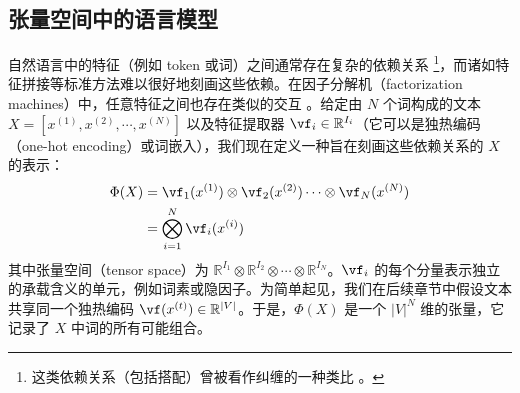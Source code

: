 \documentclass{article}
\theoremstyle{plain}
\theoremstyle{definition}
\theoremstyle{remark}
\begin{document}


\subsection{张量空间中的语言模型}
\label{sec:lmts}






自然语言中的特征（例如 token 或词）之间通常存在复杂的依赖关系 \citep{hou2013mining}\footnote{这类依赖关系（包括搭配）曾被看作纠缠的一种类比 \citep{hou2013mining}。}，而诸如特征拼接等标准方法难以很好地刻画这些依赖。在因子分解机（factorization machines）中，任意特征之间也存在类似的交互 \citep{rendle2010factorization}。给定由 $N$ 个词构成的文本 $X = [x^{(1)}, x^{(2)}, \cdots ,x^{(N)}]$ 以及特征提取器 $\vf_i \in \mathbb{R}^{I_i}$（它可以是独热编码（one-hot encoding）或词嵌入），我们现在定义一种旨在刻画这些依赖关系的 $X$ 的表示：
%
\begin{equation}
\begin{split}
    \label{eq: Phi X}
    \Phi(X)
    &= \vf_1 (x^{(1)}) \otimes  \vf_2 (x^{(2)}) \cdots \otimes \vf_N (x^{(N)}) \\
    &= \bigotimes^N_{i=1} \vf_i (x^{(i)}) \\
\end{split}
\end{equation}
%
其中张量空间（tensor space）为 $\mathbb{R}^{I_1}\otimes\mathbb{R}^{I_2} \otimes\cdots\otimes\mathbb{R}^{I_N}$。$\vf_i$ 的每个分量表示独立的承载含义的单元，例如词素或隐因子。为简单起见，我们在后续章节中假设文本共享同一个独热编码 $\vf(x^{(t)}) \in \mathbb{R}^{|V|}$。于是，$\Phi(X)$ 是一个 $|V|^N$ 维的张量，它记录了 $X$ 中词的所有可能组合。
\end{document}
